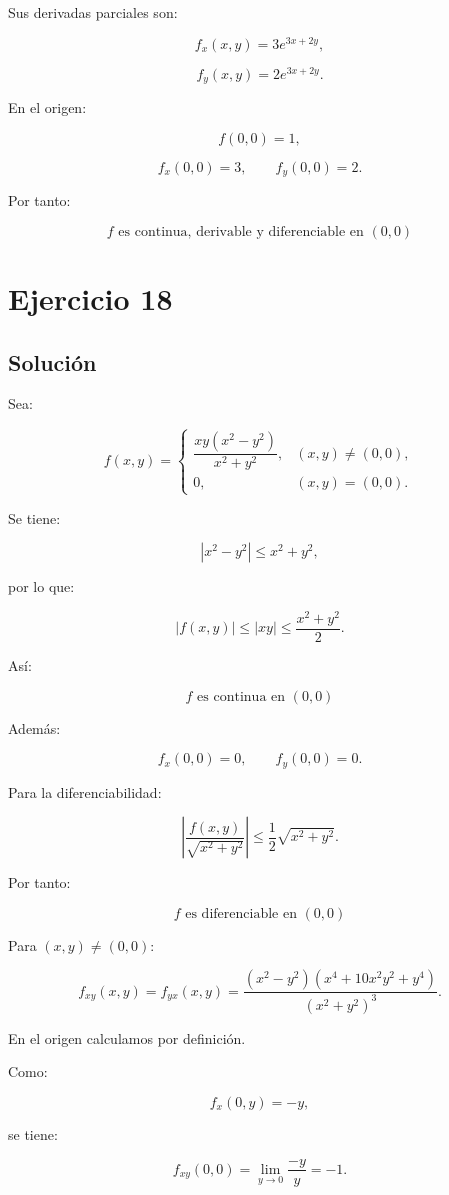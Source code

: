 \documentclass[11pt,a4paper]{article}
\begin{document}
Sus derivadas parciales son:

\[
f_x(x,y)
=
3e^{3x+2y},
\]

\[
f_y(x,y)
=
2e^{3x+2y}.
\]

En el origen:

\[
f(0,0)=1,
\]

\[
f_x(0,0)=3,
\qquad
f_y(0,0)=2.
\]

Por tanto:

\[
\boxed{
f\text{ es continua, derivable y diferenciable en }(0,0)
}
\]

\section{Ejercicio 18}
\subsection{Solución}

Sea:

\[
f(x,y)
=
\begin{cases}
\dfrac{xy(x^2-y^2)}{x^2+y^2},
&
(x,y)\neq(0,0),\\[2mm]
0,
&
(x,y)=(0,0).
\end{cases}
\]

Se tiene:

\[
|x^2-y^2|
\leq
x^2+y^2,
\]

por lo que:

\[
|f(x,y)|
\leq
|xy|
\leq
\frac{x^2+y^2}{2}.
\]

Así:

\[
\boxed{
f\text{ es continua en }(0,0)
}
\]

Además:

\[
f_x(0,0)=0,
\qquad
f_y(0,0)=0.
\]

Para la diferenciabilidad:

\[
\left|
\frac{f(x,y)}
{\sqrt{x^2+y^2}}
\right|
\leq
\frac12\sqrt{x^2+y^2}.
\]

Por tanto:

\[
\boxed{
f\text{ es diferenciable en }(0,0)
}
\]

Para \((x,y)\neq(0,0)\):

\[
f_{xy}(x,y)
=
f_{yx}(x,y)
=
\frac{
(x^2-y^2)
\left(
x^4+10x^2y^2+y^4
\right)
}{
(x^2+y^2)^3
}.
\]

En el origen calculamos por definición.

Como:

\[
f_x(0,y)=-y,
\]

se tiene:

\[
f_{xy}(0,0)
=
\lim_{y\to0}
\frac{-y}{y}
=
-1.
\]
\end{document}
